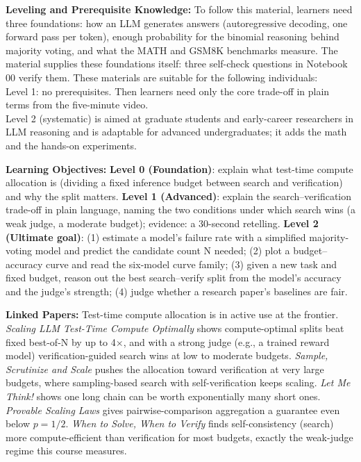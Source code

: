 \documentclass{article}
\newcommand{\blk}[1]{\vspace{1pt}\noindent\textbf{\normalsize #1}\hspace{0.5em}\ignorespaces}
\begin{document}
\blk{Leveling and Prerequisite Knowledge:}
To follow this material, learners need three foundations: how an LLM generates answers (autoregressive decoding, one forward pass per token), enough probability for the binomial reasoning behind majority voting, and what the MATH and GSM8K benchmarks measure. The material supplies these foundations itself: three self-check questions in Notebook 00 verify them. These materials are suitable for the following individuals:\\
Level 1: no prerequisites. Then learners need only the core trade-off in plain terms from the five-minute video.
\\Level 2 (systematic) is aimed at graduate students and early-career researchers in LLM reasoning and is adaptable for advanced undergraduates; it adds the math and the hands-on experiments.

\blk{Learning Objectives:}
\textbf{Level 0 (Foundation)}: explain what test-time compute allocation is (dividing a fixed inference budget between search and verification) and why the split matters. \textbf{Level 1 (Advanced)}: explain the search--verification trade-off in plain language, naming the two conditions under which search wins (a weak judge, a moderate budget); evidence: a 30-second retelling. \textbf{Level 2 (Ultimate goal)}: (1) estimate a model's failure rate with a simplified majority-voting model and predict the candidate count N needed;  (2) plot a budget--accuracy curve and read the six-model curve family; (3) given a new task and fixed budget, reason out the best search--verify split from the model's accuracy and the judge's strength; (4) judge whether a research paper's baselines are fair.

\blk{Linked Papers:}
Test-time compute allocation is in active use at the frontier. \emph{Scaling LLM Test-Time Compute Optimally} \citep{iclr2025scaling} shows compute-optimal splits beat fixed best-of-N by up to 4$\times$, and with a strong judge (e.g., a trained reward model) verification-guided search wins at low to moderate budgets. \emph{Sample, Scrutinize and Scale} \citep{icml2025sample} pushes the allocation toward verification at very large budgets, where sampling-based search with self-verification keeps scaling. \emph{Let Me Think!} \citep{neurips2025letme} shows one long chain can be worth exponentially many short ones. \emph{Provable Scaling Laws} \citep{neurips2025provable} gives pairwise-comparison aggregation a guarantee even below $p = 1/2$. \emph{When to Solve, When to Verify} \citep{colm2025whento} finds self-consistency (search) more compute-efficient than verification for most budgets, exactly the weak-judge regime this course measures.
\end{document}

